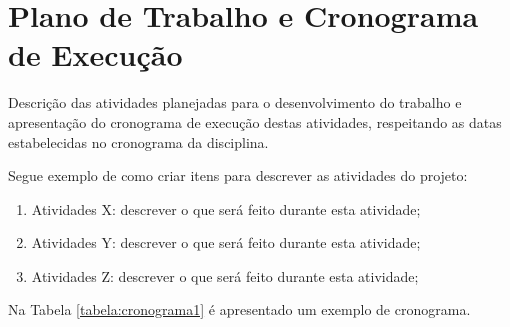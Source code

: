 \documentclass[
    12pt,               %
    a4paper,            %
    english,            %
    brazil,             %
    ]{article}
\begin{document}
\section{Plano de Trabalho e Cronograma de Execução}

	Descrição das atividades planejadas para o desenvolvimento do trabalho e apresentação do cronograma de
execução destas atividades, respeitando as datas estabelecidas no cronograma da disciplina.


	Segue exemplo de como criar itens para descrever as atividades do projeto:

\begin{enumerate}

	\item Atividades X: descrever o que será feito durante esta atividade;   \label{a1}

	\item Atividades Y: descrever o que será feito durante esta atividade;   \label{a2}

	\item Atividades Z: descrever o que será feito durante esta atividade;   \label{a3}

\end{enumerate}

Na Tabela \ref{tabela:cronograma1} é apresentado um exemplo de cronograma.

\end{document}
